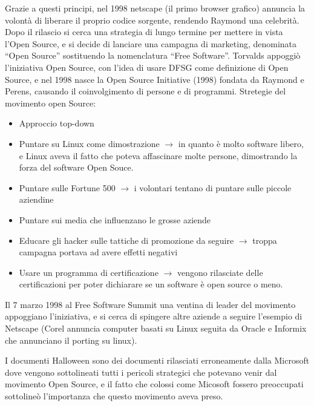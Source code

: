 Grazie a questi principi, nel 1998 netscape (il primo browser grafico) annuncia la volont\`a di liberare il proprio codice sorgente, rendendo Raymond una celebrit\`a. Dopo il rilascio si cerca una strategia di lungo termine per mettere in vista l'Open Source, e si decide di lanciare una campagna di marketing, denominata ``Open Source'' sostituendo la nomenclatura ``Free Software''. Torvalds appoggi\`o l'iniziativa Open Source, con l'idea di usare DFSG come definizione di Open Source, e nel 1998 nasce la Open Source Initiative (1998) fondata da Raymond e Perens, causando il coinvolgimento di persone e di programmi. Stretegie del movimento open Source:
\begin{itemize}

\item Approccio top-down
\item Puntare su Linux come dimostrazione $\to$ in quanto \`e molto software libero, e Linux aveva il fatto che poteva affascinare molte persone, dimostrando la forza del software Open Souce.
\item Puntare sulle Fortune 500 $\to$ i volontari tentano di puntare sulle piccole aziendine
\item Puntare sui media che influenzano le grosse aziende
\item Educare gli hacker sulle tattiche di promozione da seguire $\to$ troppa campagna portava ad avere effetti negativi
\item Usare un programma di certificazione $\to$ vengono rilasciate delle certificazioni per poter dichiarare se un software \`e open source o meno.

\end{itemize}

Il 7 marzo 1998 al Free Software Summit una ventina di leader del movimento appoggiano l'iniziativa, e si cerca di spingere altre aziende a seguire l'esempio di Netscape (Corel annuncia computer basati su Linux seguita da Oracle e Informix che annunciano il porting su linux).

I documenti Halloween sono dei documenti rilasciati erroneamente dalla Microsoft dove vengono sottolineati tutti i pericoli strategici che potevano venir dal movimento Open Source, e il fatto che colossi come Micosoft fossero preoccupati sottoline\`o l'importanza che questo movimento aveva preso.

